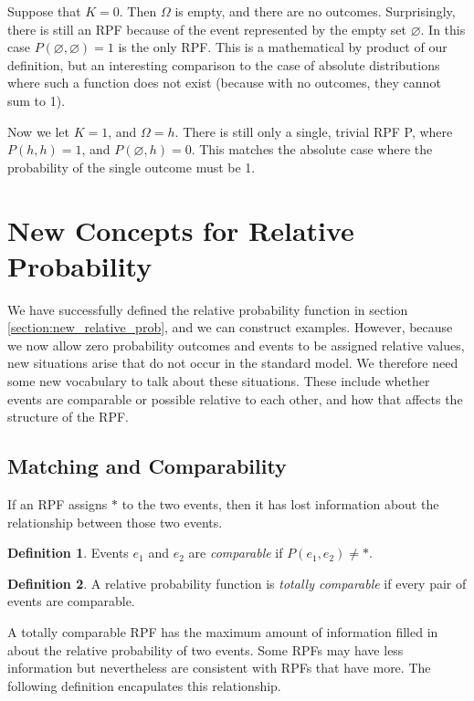 \documentclass[twoside]{article}
\theoremstyle{plain}%
\theoremstyle{definition}
\newtheorem{definition}{Definition}[section]
\theoremstyle{remark}
\begin{document}
Suppose that \(K = 0\). Then \(\Omega\) is empty, and there are no outcomes. Surprisingly, there is still an RPF because of the event represented by the empty set \(\varnothing\). In this case \(P(\varnothing, \varnothing) = 1\) is the only RPF. This is a mathematical by product of our definition, but an interesting comparison to the case of absolute distributions where such a function does not exist (because with no outcomes, they cannot sum to 1).

Now we let \(K = 1\), and \(\Omega = {h}\). There is still only a single, trivial RPF P, where \(P(h, h) = 1\), and \(P(\varnothing, h) = 0\). This matches the absolute case where the probability of the single outcome must be 1.

\section{New Concepts for Relative Probability}

We have successfully defined the relative probability function in section \ref{section:new_relative_prob}, and we can construct examples. However, because we now allow zero probability outcomes and events to be assigned relative values, new situations arise that do not occur in the standard model. We therefore need some new vocabulary to talk about these situations. These include whether events are comparable or possible relative to each other, and how that affects the structure of the RPF.

\subsection{Matching and Comparability}

If an RPF assigns \(\ast\) to the two events, then it has lost information about the relationship between those two events.

\begin{definition}
Events \(e_1\) and \(e_2\) are \textit{comparable} if \(P(e_1, e_2) \neq \ast\).
\end{definition}

\begin{definition}
A relative probability function is \textit{totally comparable} if every pair of events are comparable.
\end{definition}

A totally comparable RPF has the maximum amount of information filled in about the relative probability of two events. Some RPFs may have less information but nevertheless are consistent with RPFs that have more. The following definition encapulates this relationship.
\end{document}
